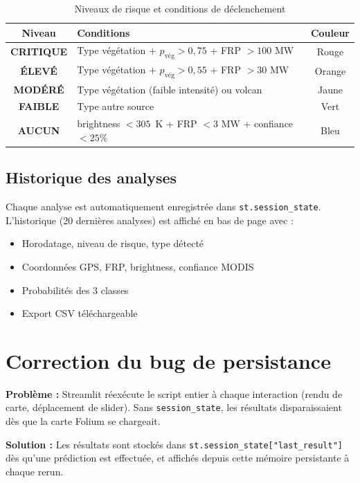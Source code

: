 \documentclass[12pt,a4paper]{report}
\begin{document}
\begin{table}[H]
\centering
\begin{tabular}{|c|p{6cm}|c|}
\hline
\rowcolor{bleu!15}
\textbf{Niveau} & \textbf{Conditions} & \textbf{Couleur} \\
\hline
\textbf{CRITIQUE} & Type v\'{e}g\'{e}tation + $p_{\text{v\'{e}g}} > 0,75$ + FRP $> 100$ MW & Rouge \\
\hline
\textbf{\'{E}LEV\'{E}} & Type v\'{e}g\'{e}tation + $p_{\text{v\'{e}g}} > 0,55$ + FRP $> 30$ MW & Orange \\
\hline
\textbf{MOD\'{E}R\'{E}} & Type v\'{e}g\'{e}tation (faible intensit\'{e}) ou volcan & Jaune \\
\hline
\textbf{FAIBLE} & Type autre source & Vert \\
\hline
\textbf{AUCUN} & brightness $< 305$~K + FRP $< 3$ MW + confiance $< 25\%$ & Bleu \\
\hline
\end{tabular}
\caption{Niveaux de risque et conditions de d\'{e}clenchement}
\label{tab:risk}
\end{table}

\subsection{Historique des analyses}

Chaque analyse est automatiquement enregistr\'{e}e dans \texttt{st.session\_state}. L'historique (20 derni\`{e}res analyses) est affich\'{e} en bas de page avec :
\begin{itemize}
    \item Horodatage, niveau de risque, type d\'{e}tect\'{e}
    \item Coordonn\'{e}es GPS, FRP, brightness, confiance MODIS
    \item Probabilit\'{e}s des 3 classes
    \item Export CSV t\'{e}l\'{e}chargeable
\end{itemize}

\section{Correction du bug de persistance}

\begin{infobox}
\textbf{Probl\`{e}me :} Streamlit r\'{e}ex\'{e}cute le script entier \`{a} chaque interaction (rendu de carte, d\'{e}placement de slider). Sans \texttt{session\_state}, les r\'{e}sultats disparaissaient d\`{e}s que la carte Folium se chargeait.

\textbf{Solution :} Les r\'{e}sultats sont stock\'{e}s dans \texttt{st.session\_state["last\_result"]} d\`{e}s qu'une pr\'{e}diction est effectu\'{e}e, et affich\'{e}s depuis cette m\'{e}moire persistante \`{a} chaque rerun.
\end{infobox}
\end{document}
